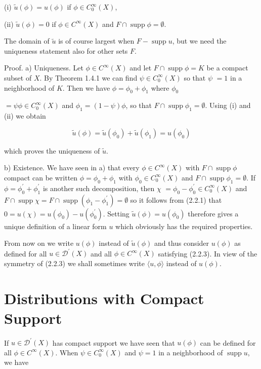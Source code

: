 (i) $\tilde{u}(\phi)=u(\phi)$ if $\phi \in C_{0}^{\infty}(X)$,

(ii) $\tilde{u}(\phi)=0$ if $\phi \in C^{\infty}(X)$ and $F \cap \operatorname{supp} \phi=\emptyset$.

The domain of $\tilde{u}$ is of course largest when $F-\operatorname{supp} u$, but we need the uniqueness statement also for other sets $F$.

Proof. a) Uniqueness. Let $\phi \in C^{\infty}(X)$ and let $F \cap \operatorname{supp} \phi=K$ be a compact subset of $X$. By Theorem 1.4.1 we can find $\psi \in C_{0}^{\infty}(X)$ so that $\psi$ $=1$ in a neighborhood of $K$. Then we have $\phi=\phi_{0}+\phi_{1}$ where $\phi_{0}$

$=\psi \phi \in C_{0}^{\infty}(X)$ and $\phi_{1}=(1-\psi) \phi$, so that $F \cap \operatorname{supp} \phi_{1}=\emptyset$. Using (i) and (ii) we obtain

\[
\tilde{u}(\phi)=\tilde{u}\left(\phi_{0}\right)+\tilde{u}\left(\phi_{1}\right)=u\left(\phi_{0}\right)
\]

which proves the uniqueness of $\tilde{u}$.

b) Existence. We have seen in a) that every $\phi \in C^{\infty}(X)$ with $F \cap \operatorname{supp} \phi$ compact can be written $\phi=\phi_{0}+\phi_{1}$ with $\phi_{0} \in C_{0}^{\infty}(X)$ and $F \cap \operatorname{supp} \phi_{1}=\emptyset$. If $\phi=\phi_{0}^{\prime}+\phi_{1}^{\prime}$ is another such decomposition, then $\chi$ $=\phi_{0}-\phi_{0}^{\prime} \in C_{0}^{\infty}(X)$ and $F \cap \operatorname{supp} \chi=F \cap \operatorname{supp}\left(\phi_{1}-\phi_{1}^{\prime}\right)=\emptyset$ so it follows from (2.2.1) that $0=u(\chi)=u\left(\phi_{0}\right)-u\left(\phi_{0}^{\prime}\right)$. Setting $\tilde{u}(\phi)=u\left(\phi_{0}\right)$ therefore gives a unique definition of a linear form $u$ which obviously has the required properties.

From now on we write $u(\phi)$ instead of $\tilde{u}(\phi)$ and thus consider $u(\phi)$ as defined for all $u \in \mathscr{D}^{\prime}(X)$ and all $\phi \in C^{\infty}(X)$ satisfying (2.2.3). In view of the symmetry of (2.2.3) we shall sometimes write $\langle u, \phi\rangle$ instead of $u(\phi)$.

\section{Distributions with Compact Support}
If $u \in \mathscr{D}^{\prime}(X)$ has compact support we have seen that $u(\phi)$ can be defined for all $\phi \in C^{\infty}(X)$. When $\psi \in C_{0}^{\infty}(X)$ and $\psi=1$ in a neighborhood of $\operatorname{supp} u$, we have


